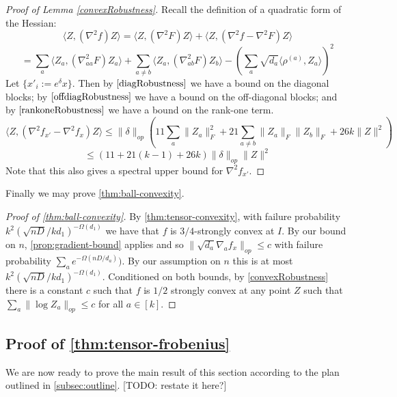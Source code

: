 \documentclass{article}
\newcommand\samp{x}
\newcommand{\CF}[1]{{\color{purple}[CF: #1]}}
\newcommand{\AR}[1]{{\color{orange}[AR: #1]}}
\newcommand{\TODO}[1]{{\color{blue}[TODO: #1]}}
\begin{document}
\begin{proof} [Proof of Lemma \ref{convexRobustness}]
Recall the definition of a quadratic form of the Hessian:
\[ \langle Z, (\nabla^{2} f) Z \rangle = \langle Z, (\nabla^{2} F) Z \rangle + \langle Z, (\nabla^{2} f - \nabla^{2} F) Z \rangle     \]
\[ = \sum_{a} \langle Z_{a}, (\nabla^{2}_{aa} F) Z_{a} \rangle + \sum_{a \neq b} \langle Z_{a}, (\nabla^{2}_{ab} F) Z_{b} \rangle - \left( \sum_{a} \sqrt{d_{a}} \langle \rho^{(a)}, Z_{a} \rangle  \right)^{2}       \]
Let $\{\samp'_{i} := e^{\delta} \samp\}$. Then by $\ref{diagRobustness}$ we have a bound on the diagonal blocks; by $\ref{offdiagRobustness}$ we have a bound on the off-diagonal blocks; and by $\ref{rankoneRobustness}$ we have a bound on the rank-one term. 
\[ \langle Z, (\nabla^2 f_{\samp'} - \nabla^{2} f_{\samp}) Z \rangle \leq \|\delta\|_{op} \left( 11 \sum_{a} \|Z_{a}\|_{F}^{2} + 21 \sum_{a \neq b} \|Z_{a}\|_{F} \|Z_{b}\|_{F} + 26 k \|Z\|^{2} \right)   \]
\[ \leq (11 + 21(k-1) + 26 k) \|\delta\|_{op} \|Z\|^{2}    \]
Note that this also gives a spectral upper bound for $\nabla^{2} f_{\samp'}$. 
\end{proof}

Finally we may prove \cref{thm:ball-convexity}.
\begin{proof}[Proof of \cref{thm:ball-convexity}]
By \cref{thm:tensor-convexity}, with failure probability $k^2 ({\sqrt{nD}}/{kd_1})^{ - \Omega(d_1)}$ we have that $f$ is $3/4$-strongly convex at $I$. By our bound on $n$,  \cref{prop:gradient-bound} applies and so $\|\sqrt{d_{a}} \nabla_{a} f_{\samp}\|_{op} \leq c$ with failure probability $\sum_a e^{ - \Omega(nD/d_a)})$. By our assumption on $n$ this is at most $k^2 ({\sqrt{nD}}/{kd_1})^{ - \Omega(d_1)}$. Conditioned on both bounds, by \cref{convexRobustness} there is a constant $c$ such that $f$ is $1/2$ strongly convex at any point $Z$ such that $\sum_a \|\log Z_a\|_{op} \leq  c$ for all $a \in [k]$. \end{proof}











\subsection{Proof of \cref{thm:tensor-frobenius}}
We are now ready to prove the main result of this section according to the plan outlined in \cref{subsec:outline}.
\TODO{restate it here?}
\end{document}
